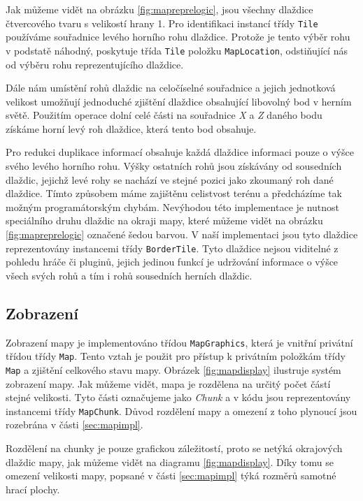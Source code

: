 Jak můžeme vidět na obrázku \ref{fig:mapreprelogic}, jsou všechny dlaždice čtvercového tvaru s velikostí hrany 1. Pro identifikaci instancí třídy \texttt{Tile} používáme souřadnice levého horního rohu dlaždice. Protože je tento výběr rohu v podstatě náhodný, poskytuje třída \texttt{Tile} položku \texttt{MapLocation}, odstiňující nás od výběru rohu reprezentujícího dlaždice.

Dále nám umístění rohů dlaždic na celočíselné souřadnice a jejich jednotková velikost umožňují jednoduché zjištění dlaždice obsahující libovolný bod v herním světě. Použitím operace dolní celé části na souřadnice \textit{X} a \textit{Z} daného bodu získáme horní levý roh dlaždice, která tento bod obsahuje.

Pro redukci duplikace informací obsahuje každá dlaždice informaci pouze o výšce svého levého horního rohu. Výšky ostatních rohů jsou získávány od sousedních dlaždic, jejichž levé rohy se nachází ve stejné pozici jako zkoumaný roh dané dlaždice. Tímto způsobem máme zajištěnu celistvost terénu a předcházíme tak možným programátorským chybám. Nevýhodou této implementace je nutnost speciálního druhu dlaždic na okraji mapy, které můžeme vidět na obrázku \ref{fig:mapreprelogic} označené šedou barvou. V naší implementaci jsou tyto dlaždice reprezentovány instancemi třídy \texttt{BorderTile}. Tyto dlaždice nejsou viditelné z pohledu hráče či pluginů, jejich jedinou funkcí je udržování informace o výšce všech svých rohů a tím i rohů sousedních herních dlaždic. 


\subsection{Zobrazení}
Zobrazení mapy je implementováno třídou \texttt{MapGraphics}, která je vnitřní privátní třídou třídy \texttt{Map}. Tento vztah je použit pro přístup k privátním položkám třídy \texttt{Map} a zjištění celkového stavu mapy. Obrázek \ref{fig:mapdisplay} ilustruje systém zobrazení mapy. Jak můžeme vidět, mapa je rozdělena na určitý počet částí stejné velikosti. Tyto části označujeme jako \textit{Chunk} a v kódu jsou reprezentovány instancemi třídy \texttt{MapChunk}. Důvod rozdělení mapy a omezení z toho plynoucí jsou rozebrána v části \ref{sec:mapimpl}. 

Rozdělení na chunky je pouze grafickou záležitostí, proto se netýká okrajových dlaždic mapy, jak můžeme vidět na diagramu \ref{fig:mapdisplay}. Díky tomu se omezení velikosti mapy, popsané v části \ref{sec:mapimpl} týká rozměrů samotné hrací plochy.

